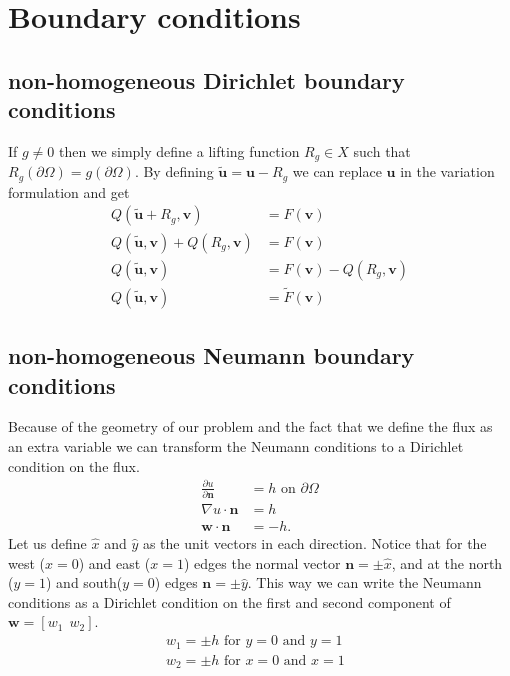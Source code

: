 \section{Boundary conditions}
\subsection{non-homogeneous Dirichlet boundary conditions}
If $g \neq 0$ then we simply define a lifting function $R_g \in X$ such that $R_g(\partial \Omega) = g(\partial \Omega)$. By defining $\tilde{\mathbf{u}}=\mathbf{u}-R_g$ we can replace $\mathbf{u}$ in the variation formulation and get 
\begin{align}
	Q(\tilde{\mathbf{u}}+R_g,\mathbf{v}) &= F(\mathbf{v}) \\
	Q(\tilde{\mathbf{u}},\mathbf{v})+Q(R_g,\mathbf{v}) &= F(\mathbf{v}) \\
	Q(\tilde{\mathbf{u}},\mathbf{v}) &= F(\mathbf{v}) - Q(R_g,\mathbf{v})\\
	Q(\tilde{\mathbf{u}},\mathbf{v}) &= \tilde{F}(\mathbf{v}) 
	\label{eq:liftingFunc}
\end{align}
%
\subsection{non-homogeneous Neumann boundary conditions}
Because of the geometry of our problem and the fact that we define the flux as an extra variable we can transform the Neumann conditions to a Dirichlet condition on the flux. 
\begin{align}
	\frac{\partial u}{\partial \mathbf{n}} &= h \text{  on   } \partial \Omega \\
	\nabla u \cdot \mathbf{n} &= h \\
	 \mathbf{w} \cdot \mathbf{n} &= -h. 
	\label{eq:neumann}
\end{align}
Let us define $\hat{x}$ and $\hat{y}$ as the unit vectors in each direction. Notice that for the west ($x=0$) and east ($x=1$) edges the normal vector $\mathbf{n}= \pm\hat{x}$, and at the north ($y=1$) and south($y=0$) edges $\mathbf{n}=\pm \hat{y}$. This way we can write the Neumann conditions as a Dirichlet condition on the first and second component of $\mathbf{w}= [ w_1 \:\: w_2]$. 
\begin{align}
	w_1 = \pm h \text{    for $y = 0$ and $y=1$ }\\
	w_2 = \pm h \text{    for $x = 0$ and $x=1$ }
	\label{eq:neumannAsDirichlet}
\end{align}
